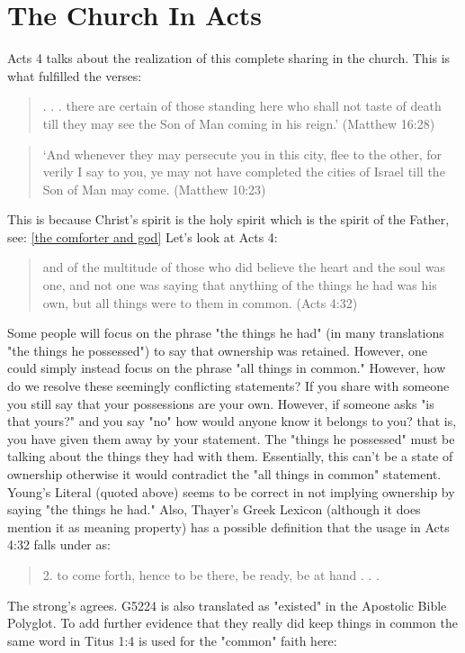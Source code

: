 \documentclass[11pt]{article}
\begin{document}
\section{The Church In Acts}
\indent Acts 4 talks about the realization of this complete sharing in the church. This is what fulfilled the verses: 
\begin{quote}
. . . there are certain of those standing here who shall not taste of death till they may see the Son of Man coming in his reign.' (Matthew 16:28) 
\end{quote}
\begin{quote}
`And whenever they may persecute you in this city, flee to the other, for verily I say to you, ye may not have completed the cities of Israel till the Son of Man may come. (Matthew 10:23)
\end{quote} This is because Christ's spirit is the holy spirit which is the spirit of the Father, see: \ref{the comforter and god} 
Let's look at Acts 4:
\begin{quote}
and of the multitude of those who did believe the heart and the soul was one, and not one was saying that anything of the things he had was his own, but all things were to them in common. (Acts 4:32)
\end{quote}
Some people will focus on the phrase "the things he had" (in many translations "the things he possessed") to say that ownership was retained. However, one could simply instead focus on the phrase "all things in common." However, how do we resolve these seemingly conflicting statements? If you share with someone you still say that your possessions are your own. However, if someone asks "is that yours?" and you say "no" how would anyone know it belongs to you? that is, you have given them away by your statement. The "things he possessed" must be talking about the things they had with them. Essentially, this can't be a state of ownership otherwise it would contradict the "all things in common" statement. 
Young's Literal (quoted above) seems to be correct in not implying ownership by saying "the things he had." Also, Thayer's Greek Lexicon (although it does mention it as meaning property) has a possible definition that the usage in Acts 4:32 falls under as:
\begin{quote}
2. to come forth, hence to be there, be ready, be at hand . . .
\end{quote}
The strong's agrees.\cite{possessions thayer's strong's} G5224 is also translated as "existed" in the Apostolic Bible Polyglot.\cite{G5224 apostolic bible polyglot} To add further evidence that they really did keep things in common the same word in Titus 1:4 is used for the "common" faith here: 
\end{document}
